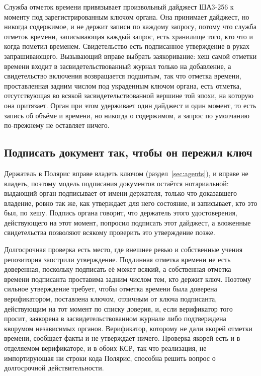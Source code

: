 Служба отметок времени привязывает произвольный дайджест ША3-256 к моменту под зарегистрированным
ключом органа. Она принимает дайджест, но никогда содержимое, и не держит записи по каждому
запросу, потому что служба отметок времени, записывающая каждый запрос, есть хранилище того, кто
что и когда пометил временем. Свидетельство есть подписанное утверждение в руках запрашивающего.
Вызывающий вправе выбрать заякоривание: хеш самой отметки времени входит в
засвидетельствованный журнал только на добавление, а свидетельство включения возвращается
подшитым, так что отметка времени, проставленная задним числом под украденным ключом органа, есть
отметка, отсутствующая во всякой засвидетельствованной вершине той эпохи, на которую она
притязает. Орган при этом удерживает один дайджест и один момент, то есть запись об объёме и
времени, но никогда о содержимом, а запрос по умолчанию по-прежнему не оставляет ничего. \sImpl

\subsection{Подписать документ так, чтобы он пережил ключ}

Держатель в Полярис вправе владеть ключом (раздел~\ref{sec:agents}), и вправе не владеть, поэтому
модель подписания документов остаётся нотариальной: выдающий орган подписывает от имени держателя,
только что доказавшего владение, ровно так же, как утверждает для него состояние, и записывает,
кто это был, по хешу. Подпись органа говорит, что держатель этого удостоверения, действующего на
этот момент, попросил подписать этот дайджест, а вложенные свидетельства позволяют всякому
проверить это утверждение позже. \sImpl

Долгосрочная проверка есть место, где внешнее ревью и собственные учения репозитория заострили
утверждение. Подлинная отметка времени не есть доверенная, поскольку подписать её может всякий, а
собственная отметка времени подписанта проставима задним числом тем, кто держит ключ. Поэтому
сильное утверждение требует, чтобы отметка времени была доверена верификатором, поставлена ключом,
отличным от ключа подписанта, действующим на тот момент по списку доверия, и, если верификатор того
просит, заякорена в засвидетельствованном журнале либо подтверждена кворумом независимых органов.
Верификатор, которому не дали якорей отметки времени, сообщает факты и не утверждает ничего.
Проверка якорей есть и в отделяемом верификаторе, и в обоих КСР, так что реализация, не
импортирующая ни строки кода Полярис, способна решить вопрос о долгосрочной действительности.
\sImpl

